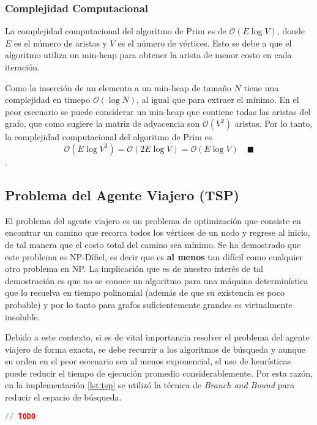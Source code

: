 \documentclass[12pt]{article}
\begin{document}
  \subsubsection{Complejidad Computacional}
  La complejidad computacional del algoritmo de Prim es de $\mathcal{O}(E\log V)$, donde $E$ es el número de aristas
  y $V$ es el número de vértices. Esto se debe a que el algoritmo utiliza un min-heap para obtener la arista
  de menor costo en cada iteración. 
  
  Como la inserción de un elemento a un min-heap de tamaño $N$ tiene una complejidad en timepo $\mathcal{O}(\log N)$, al igual que para extraer el mínimo. 
  En el peor escenario se puede considerar un min-heap que contiene todas las aristas del grafo, que como sugiere la matriz de adyacencia
  son $\mathcal{O}(V^2)$ aristas. Por lo tanto, la complejidad computacional del algoritmo de Prim es 
  $$\mathcal{O}(E\log V^{2}) = \mathcal{O}(2E\log V) = \mathcal{O}(E\log V) \quad \blacksquare$$.

  \subsection{Problema del Agente Viajero (TSP)}

  El problema del agente viajero es un problema de optimización que consiste en encontrar un camino que recorra todos los vértices de un nodo y regrese al inicio,
  de tal manera que el costo total del camino sea mínimo. Se ha demostrado que este problema es NP-Díficl, es decir que es \textbf{al menos} tan difícil como cualquier otro problema en NP.
  La implicación que es de nuestro interés de tal demostración es que no se conoce un algoritmo para una máquina determinística que lo resuelva en tiempo polinomial (además de que su existencia 
  es poco probable) y por lo tanto para grafos suficientemente grandes es virtualmente insoluble.

  Debido a este contexto, si es de vital importancia resolver el problema del agente viajero de forma exacta, se debe recurrir a los algoritmos de búsqueda y aunque su orden en el peor escenario 
  sea al menos exponencial, el uso de heurísticas puede reducir el tiempo de ejecución promedio considerablemente. Por esta razón, en la implementación \autoref{lst:tsp} se utilizó la técnica de
  \textit{Branch and Bound} para reducir el espacio de búsqueda.

  \begin{lstlisting}[language=cpp, caption={Branch and Bound para TSP}, label={lst:tsp}]
// TODO
  \end{lstlisting}
\end{document}
